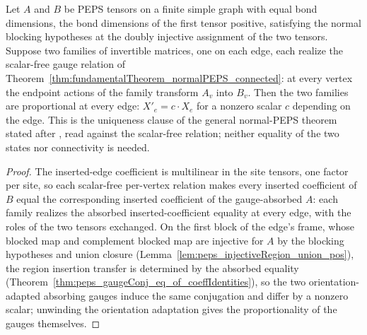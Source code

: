 \begin{theorem}%
    \label{thm:fundamentalTheorem_normalPEPS_gauge_unique}
    \leanok
    Let $A$ and $B$ be PEPS tensors on a finite simple graph with equal bond
    dimensions, the bond dimensions of the first tensor positive, satisfying
    the normal blocking hypotheses at the doubly injective assignment of the
    two tensors.  Suppose two families of invertible matrices, one on each
    edge, each realize the scalar-free gauge relation of
    Theorem~\ref{thm:fundamentalTheorem_normalPEPS_connected}: at every vertex
    the endpoint actions of the family transform $A_v$ into $B_v$.  Then the
    two families are proportional at every edge: $X'_e = c\cdot X_e$ for a
    nonzero scalar $c$ depending on the edge.  This is the uniqueness clause
    of the general normal-PEPS theorem stated after
    \cite[Theorem~3]{Molnar2018NormalPEPS}, read against the scalar-free
    relation; neither equality of the two states nor connectivity is needed.
    \begin{proof}
        \leanok
        The inserted-edge coefficient is multilinear in the site tensors, one
        factor per site, so each scalar-free per-vertex relation makes every
        inserted coefficient of $B$ equal the corresponding inserted
        coefficient of the gauge-absorbed $A$: each family realizes the
        absorbed inserted-coefficient equality at every edge, with the roles
        of the two tensors exchanged.  On the first block of the edge's frame,
        whose blocked map and complement blocked map are injective for $A$ by
        the blocking hypotheses and union closure
        (Lemma~\ref{lem:peps_injectiveRegion_union_pos}), the region insertion
        transfer is determined by the absorbed equality
        (Theorem~\ref{thm:peps_gaugeConj_eq_of_coeffIdentities}), so the two
        orientation-adapted absorbing gauges induce the same conjugation and
        differ by a nonzero scalar; unwinding the orientation adaptation gives
        the proportionality of the gauges themselves.
    \end{proof}
\end{theorem}

